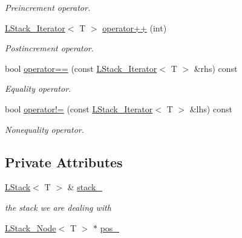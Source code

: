 \begin{DoxyCompactItemize}
\begin{DoxyCompactList}\small\item\em Preincrement operator. \item\end{DoxyCompactList}\item 
\hyperlink{classMadara_1_1Utility_1_1LStack__Iterator}{LStack\_\-Iterator}$<$ T $>$ \hyperlink{classMadara_1_1Utility_1_1LStack__Iterator_a691a0698eed4104410124d9e97f70f2b}{operator++} (int)
\begin{DoxyCompactList}\small\item\em Postincrement operator. \item\end{DoxyCompactList}\item 
bool \hyperlink{classMadara_1_1Utility_1_1LStack__Iterator_acd5e40634873c727a6cc8bf2bb754fcb}{operator==} (const \hyperlink{classMadara_1_1Utility_1_1LStack__Iterator}{LStack\_\-Iterator}$<$ T $>$ \&rhs) const 
\begin{DoxyCompactList}\small\item\em Equality operator. \item\end{DoxyCompactList}\item 
bool \hyperlink{classMadara_1_1Utility_1_1LStack__Iterator_a2bc26732921c2f3376231dede72883a1}{operator!=} (const \hyperlink{classMadara_1_1Utility_1_1LStack__Iterator}{LStack\_\-Iterator}$<$ T $>$ \&lhs) const 
\begin{DoxyCompactList}\small\item\em Nonequality operator. \item\end{DoxyCompactList}\end{DoxyCompactItemize}
\subsection*{Private Attributes}
\begin{DoxyCompactItemize}
\item 
\hyperlink{classMadara_1_1Utility_1_1LStack}{LStack}$<$ T $>$ \& \hyperlink{classMadara_1_1Utility_1_1LStack__Iterator_ae3dbe2ad34a37cc94914706446a6f1f8}{stack\_\-}
\begin{DoxyCompactList}\small\item\em the stack we are dealing with \item\end{DoxyCompactList}\item 
\hyperlink{classMadara_1_1Utility_1_1LStack__Node}{LStack\_\-Node}$<$ T $>$ $\ast$ \hyperlink{classMadara_1_1Utility_1_1LStack__Iterator_a8951a9c2a00f7e7b0a18104f322c3007}{pos\_\-}
\end{DoxyCompactItemize}


